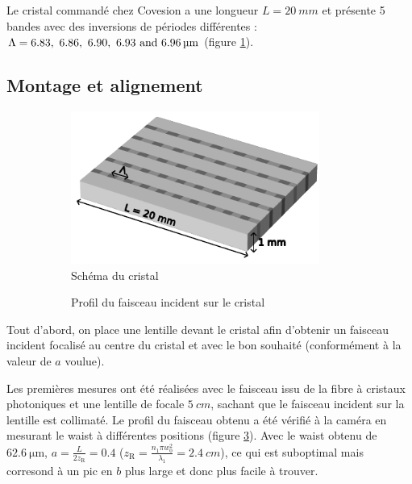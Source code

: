 \documentclass[11pt,a4paper] { article}
\newcommand{\zr}{z_\mathsc{R}}
\newcommand{\mathsc}[1]{\mathrm{\scriptscriptstyle {#1}}}
\begin{document}
Le cristal commandé chez Covesion a une longueur $L=\SI{20}{mm}$ et présente 5 bandes avec des inversions de périodes différentes : $\Lambda = \qtylist[list-units = single]{6.83; 6.86 ; 6.90 ; 6.93 ; 6,96}{\micro\meter}$ (figure \ref{fig:sc}).

\subsection{Montage et alignement} 

\begin{figure}[htpb]
\centering
\hspace*{-0.8cm}
\begin{subfigure}[b]{0.48\textwidth}
	\centering
	\includegraphics[height=5cm]{./img/cristal.pdf}
	\vspace{0.8cm}
	\caption{Schéma du cristal}
	\label{fig:sc}
\end{subfigure}
\centering
\hspace*{0.4cm}
\begin{subfigure}[b]{0.48\textwidth}
    
	\vspace{-0.5cm}
    \caption{Profil du faisceau incident sur le cristal}
    \label{fig:wincident}
\end{subfigure}
\caption{}
\end{figure}

Tout d'abord, on place une lentille devant le cristal afin d'obtenir un faisceau incident focalisé au centre du cristal et avec le bon souhaité (conformément à la valeur de $a$ voulue).

Les premières mesures ont été réalisées avec le faisceau issu de la fibre à cristaux photoniques et une lentille de focale $\SI{5}{cm}$, sachant que le faisceau incident sur la lentille est collimaté. Le profil du faisceau obtenu a été vérifié à la caméra en mesurant le waist à différentes positions (figure \ref{fig:wincident}). Avec le waist obtenu de $\SI{62.6}{\micro\meter}$, $a=\frac{L}{2\zr}=0.4$ ($\zr = \frac{n_1 \pi w_0^2}{\lambda_1} = \SI{2.4}{cm}$), 
 ce qui est suboptimal mais corresond à un pic en $b$ plus large et donc plus facile à trouver.
\end{document}
